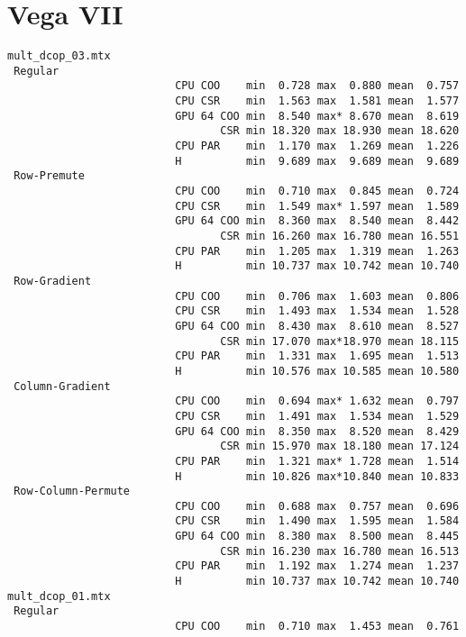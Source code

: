 \newpage
\twocolumn
\section{Vega VII}
\label{sec:vega}
\tiny

\begin{verbatim}
mult_dcop_03.mtx
 Regular
                          CPU COO    min  0.728 max  0.880 mean  0.757
                          CPU CSR    min  1.563 max  1.581 mean  1.577
                          GPU 64 COO min  8.540 max* 8.670 mean  8.619
                                 CSR min 18.320 max 18.930 mean 18.620
                          CPU PAR    min  1.170 max  1.269 mean  1.226
                          H          min  9.689 max  9.689 mean  9.689
 Row-Premute
                          CPU COO    min  0.710 max  0.845 mean  0.724
                          CPU CSR    min  1.549 max* 1.597 mean  1.589
                          GPU 64 COO min  8.360 max  8.540 mean  8.442
                                 CSR min 16.260 max 16.780 mean 16.551
                          CPU PAR    min  1.205 max  1.319 mean  1.263
                          H          min 10.737 max 10.742 mean 10.740
 Row-Gradient
                          CPU COO    min  0.706 max  1.603 mean  0.806
                          CPU CSR    min  1.493 max  1.534 mean  1.528
                          GPU 64 COO min  8.430 max  8.610 mean  8.527
                                 CSR min 17.070 max*18.970 mean 18.115
                          CPU PAR    min  1.331 max  1.695 mean  1.513
                          H          min 10.576 max 10.585 mean 10.580
 Column-Gradient
                          CPU COO    min  0.694 max* 1.632 mean  0.797
                          CPU CSR    min  1.491 max  1.534 mean  1.529
                          GPU 64 COO min  8.350 max  8.520 mean  8.429
                                 CSR min 15.970 max 18.180 mean 17.124
                          CPU PAR    min  1.321 max* 1.728 mean  1.514
                          H          min 10.826 max*10.840 mean 10.833
 Row-Column-Permute
                          CPU COO    min  0.688 max  0.757 mean  0.696
                          CPU CSR    min  1.490 max  1.595 mean  1.584
                          GPU 64 COO min  8.380 max  8.500 mean  8.445
                                 CSR min 16.230 max 16.780 mean 16.513
                          CPU PAR    min  1.192 max  1.274 mean  1.237
                          H          min 10.737 max 10.742 mean 10.740
mult_dcop_01.mtx
 Regular
                          CPU COO    min  0.710 max  1.453 mean  0.761

\end{verbatim}
